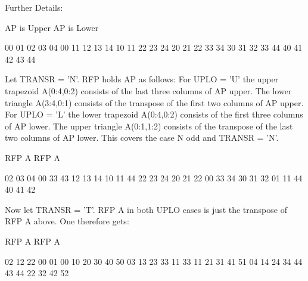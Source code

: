 \begin{DoxyParagraph}{Further Details\+: }
\begin{DoxyVerb}
     AP is Upper                 AP is Lower

   00 01 02 03 04              00
      11 12 13 14              10 11
         22 23 24              20 21 22
            33 34              30 31 32 33
               44              40 41 42 43 44


  Let TRANSR = 'N'. RFP holds AP as follows:
  For UPLO = 'U' the upper trapezoid A(0:4,0:2) consists of the last
  three columns of AP upper. The lower triangle A(3:4,0:1) consists of
  the transpose of the first two columns of AP upper.
  For UPLO = 'L' the lower trapezoid A(0:4,0:2) consists of the first
  three columns of AP lower. The upper triangle A(0:1,1:2) consists of
  the transpose of the last two columns of AP lower.
  This covers the case N odd and TRANSR = 'N'.

         RFP A                   RFP A

        02 03 04                00 33 43
        12 13 14                10 11 44
        22 23 24                20 21 22
        00 33 34                30 31 32
        01 11 44                40 41 42

  Now let TRANSR = 'T'. RFP A in both UPLO cases is just the
  transpose of RFP A above. One therefore gets:

           RFP A                   RFP A

     02 12 22 00 01             00 10 20 30 40 50
     03 13 23 33 11             33 11 21 31 41 51
     04 14 24 34 44             43 44 22 32 42 52\end{DoxyVerb}
 
\end{DoxyParagraph}
